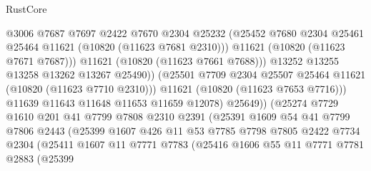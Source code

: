 \begin{lexlean}{RustCore}
\begin{coremodule}
                                  @3006
                                  @7687
                                  @7697
                                  @2422
                                  @7670
                                  @2304
                                  @25232
                                  (@25452
                                    @7680
                                    @2304
                                    @25461
                                    @25464
                                    @11621
                                    (@10820 (@11623 @7681 @2310)))
                                  @11621
                                  (@10820 (@11623 @7671 @7687)))
                                @11621
                                (@10820 (@11623 @7661 @7688)))
                              @13252
                              @13255
                              @13258
                              @13262
                              @13267
                              @25490))
                          (@25501 @7709 @2304 @25507 @25464 @11621 (@10820 (@11623 @7710 @2310)))
                          @11621
                          (@10820 (@11623 @7653 @7716)))
                        @11639
                        @11643
                        @11648
                        @11653
                        @11659
                        @12078)
                      @25649))
                  (@25274
                    @7729
                    @1610
                    @201
                    @41
                    @7799
                    @7808
                    @2310
                    @2391
                    (@25391
                      @1609
                      @54
                      @41
                      @7799
                      @7806
                      @2443
                      (@25399
                        @1607
                        @426
                        @11
                        @53
                        @7785
                        @7798
                        @7805
                        @2422
                        @7734
                        @2304
                        (@25411
                          @1607
                          @11
                          @7771
                          @7783
                          (@25416
                            @1606
                            @55
                            @11
                            @7771
                            @7781
                            @2883
                            (@25399

\end{coremodule}
\end{lexlean}
